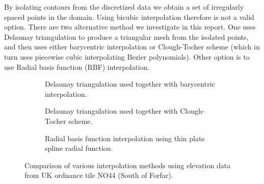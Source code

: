 \documentclass[a4paper,10pt]{report}
\begin{document}
By isolating contours from the discretized data we obtain a set of irregularly spaced points in the domain. Using bicubic interpolation therefore is not a valid option. There are two alternative method we investigate in this report. One uses Delaunay triangulation to produce a triangular mesh from the isolated points, and then uses either barycentric interpolation or Clough-Tocher scheme (which in turn uses piecewise cubic interpolating Bezier polynomials). Other option is to use Radial basis function (RBF) interpolation.


\begin{figure}[H]
    \centering
    \begin{subfigure}{\textwidth}
        
    \caption{Delaunay triangulation used together with barycentric interpolation.}
    \end{subfigure}
    \begin{subfigure}{\textwidth}
        
    \caption{Delaunay triangulation used together with Clough-Tocher scheme.}
    \end{subfigure}
    \begin{subfigure}{\textwidth}
        
    \caption{Radial basis function interpolation using thin plate spline radial function.}
    \end{subfigure}
    \caption{Comparison of various interpolation methods using elevation data from UK ordnance tile NO44 (South of Forfar).}
    \label{fig:2D_discretized_comparison}
\end{figure}
\end{document}

